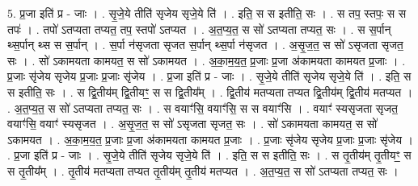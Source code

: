 \documentclass[17pt]{extarticle}
\begin{document}
5. प्र॒जा इति॑ प्र - जाः । . सृ॒जे॒ये तीति॑ सृजेय सृजे॒ये ति॑ । . इति॒ स स इतीति॒ सः । . स तप॒ स्तपः॒ स स तपः॑ । . तपो॑ ऽतप्यता तप्यत॒ तप॒ स्तपो॑ ऽतप्यत । . अ॒त॒प्य॒त॒ स सो॑ ऽतप्यता तप्यत॒ सः । . स स॒र्पान् थ्स॒र्पान् थ्स स स॒र्पान् । . स॒र्पा न॑सृजता सृजत स॒र्पान् थ्स॒र्पा न॑सृजत । . अ॒सृ॒ज॒त॒ स सो॑ ऽसृजता सृजत॒ सः । . सो॑ ऽकामयता कामयत॒ स सो॑ ऽकामयत । . अ॒का॒म॒य॒त॒ प्र॒जाः प्र॒जा अ॑कामयता कामयत प्र॒जाः । . प्र॒जाः सृ॑जेय सृजेय प्र॒जाः प्र॒जाः सृ॑जेय । . प्र॒जा इति॑ प्र - जाः । . सृ॒जे॒ये तीति॑ सृजेय सृजे॒ये ति॑ । . इति॒ स स इतीति॒ सः । . स द्वि॒तीय॑म् द्वि॒तीयꣳ॒॒ स स द्वि॒तीय᳚म् । . द्वि॒तीय॑ मतप्यता तप्यत द्वि॒तीय॑म् द्वि॒तीय॑ मतप्यत । . अ॒त॒प्य॒त॒ स सो॑ ऽतप्यता तप्यत॒ सः । . स वयाꣳ॑सि॒ वयाꣳ॑सि॒ स स वयाꣳ॑सि । . वयाꣳ॑ स्यसृजता सृजत॒ वयाꣳ॑सि॒ वयाꣳ॑ स्यसृजत । . अ॒सृ॒ज॒त॒ स सो॑ ऽसृजता सृजत॒ सः । . सो॑ ऽकामयता कामयत॒ स सो॑ ऽकामयत । . अ॒का॒म॒य॒त॒ प्र॒जाः प्र॒जा अ॑कामयता कामयत प्र॒जाः । . प्र॒जाः सृ॑जेय सृजेय प्र॒जाः प्र॒जाः सृ॑जेय । . प्र॒जा इति॑ प्र - जाः । . सृ॒जे॒ये तीति॑ सृजेय सृजे॒ये ति॑ । . इति॒ स स इतीति॒ सः । . स तृ॒तीय॑म् तृ॒तीयꣳ॒॒ स स तृ॒तीय᳚म् । . तृ॒तीय॑ मतप्यता तप्यत तृ॒तीय॑म् तृ॒तीय॑ मतप्यत । . अ॒त॒प्य॒त॒ स सो॑ ऽतप्यता तप्यत॒ सः । \newline
\end{document}
